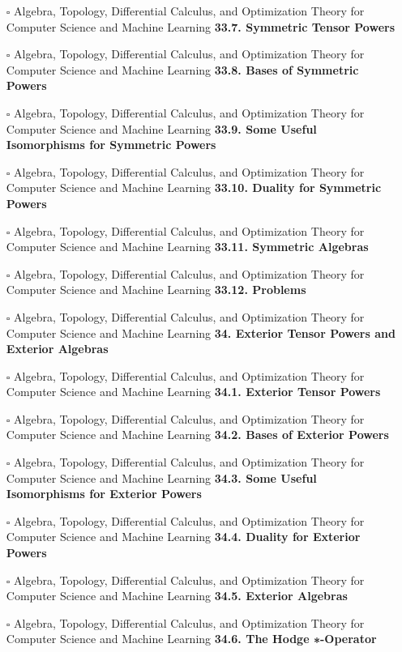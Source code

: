 \documentclass[a4, landscape, 12pt]{article}
\newcommand{\checkbox}{$\square$}%
\begin{document}
\begin{itemize}
{}
\item [\checkbox]  Algebra, Topology, Differential Calculus, and Optimization Theory for Computer Science and Machine Learning \textbf{ 33.7. Symmetric Tensor Powers
}
\item [\checkbox]  Algebra, Topology, Differential Calculus, and Optimization Theory for Computer Science and Machine Learning \textbf{ 33.8. Bases of Symmetric Powers
}
\item [\checkbox]  Algebra, Topology, Differential Calculus, and Optimization Theory for Computer Science and Machine Learning \textbf{ 33.9. Some Useful Isomorphisms for Symmetric Powers
}
\item [\checkbox]  Algebra, Topology, Differential Calculus, and Optimization Theory for Computer Science and Machine Learning \textbf{ 33.10. Duality for Symmetric Powers
}
\item [\checkbox]  Algebra, Topology, Differential Calculus, and Optimization Theory for Computer Science and Machine Learning \textbf{ 33.11. Symmetric Algebras
}
\item [\checkbox]  Algebra, Topology, Differential Calculus, and Optimization Theory for Computer Science and Machine Learning \textbf{ 33.12. Problems
}
\item [\checkbox]  Algebra, Topology, Differential Calculus, and Optimization Theory for Computer Science and Machine Learning \textbf{ 34. Exterior Tensor Powers and Exterior Algebras
}
\item [\checkbox]  Algebra, Topology, Differential Calculus, and Optimization Theory for Computer Science and Machine Learning \textbf{ 34.1. Exterior Tensor Powers
}
\item [\checkbox]  Algebra, Topology, Differential Calculus, and Optimization Theory for Computer Science and Machine Learning \textbf{ 34.2. Bases of Exterior Powers
}
\item [\checkbox]  Algebra, Topology, Differential Calculus, and Optimization Theory for Computer Science and Machine Learning \textbf{ 34.3. Some Useful Isomorphisms for Exterior Powers
}
\item [\checkbox]  Algebra, Topology, Differential Calculus, and Optimization Theory for Computer Science and Machine Learning \textbf{ 34.4. Duality for Exterior Powers
}
\item [\checkbox]  Algebra, Topology, Differential Calculus, and Optimization Theory for Computer Science and Machine Learning \textbf{ 34.5. Exterior Algebras
}
\item [\checkbox]  Algebra, Topology, Differential Calculus, and Optimization Theory for Computer Science and Machine Learning \textbf{ 34.6. The Hodge ∗-Operator
}
\end{itemize}
\end{document}
